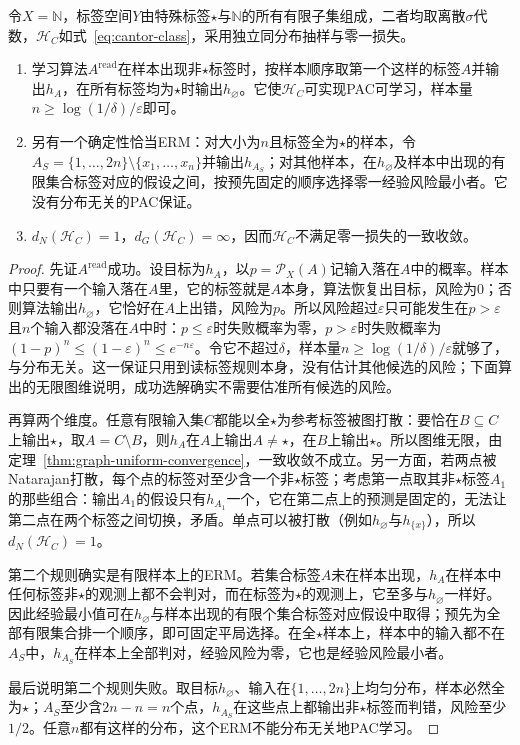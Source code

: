 \begin{theorem}[可学习性不推出一致收敛]
\label{thm:multiclass-erm-separation}
令$X=\mathbb N$，标签空间$Y$由特殊标签$\star$与$\mathbb N$的所有有限子集组成，二者均取离散$\sigma$代数，$\mathcal H_C$如式~\eqref{eq:cantor-class}，采用独立同分布抽样与零一损失。
\begin{enumerate}
 \item 学习算法$A^{\mathrm{read}}$在样本出现非$\star$标签时，按样本顺序取第一个这样的标签$A$并输出$h_A$，在所有标签均为$\star$时输出$h_{\varnothing}$。它使$\mathcal H_C$可实现PAC可学习，样本量$n\geq\log(1/\delta)/\varepsilon$即可。
 \item 另有一个确定性恰当ERM：对大小为$n$且标签全为$\star$的样本，令$A_S=\{1,\ldots,2n\}\setminus\{x_1,\ldots,x_n\}$并输出$h_{A_S}$；对其他样本，在$h_{\varnothing}$及样本中出现的有限集合标签对应的假设之间，按预先固定的顺序选择零一经验风险最小者。它没有分布无关的PAC保证。
 \item $d_N(\mathcal H_C)=1$，$d_G(\mathcal H_C)=\infty$，因而$\mathcal H_C$不满足零一损失的一致收敛。
\end{enumerate}
\end{theorem}

\begin{proof}
先证$A^{\mathrm{read}}$成功。设目标为$h_A$，以$p=\mathcal P_X(A)$记输入落在$A$中的概率。样本中只要有一个输入落在$A$里，它的标签就是$A$本身，算法恢复出目标，风险为0；否则算法输出$h_{\varnothing}$，它恰好在$A$上出错，风险为$p$。所以风险超过$\varepsilon$只可能发生在$p>\varepsilon$且$n$个输入都没落在$A$中时：$p\leq\varepsilon$时失败概率为零，$p>\varepsilon$时失败概率为$(1-p)^n\leq(1-\varepsilon)^n\leq e^{-n\varepsilon}$。令它不超过$\delta$，样本量$n\geq\log(1/\delta)/\varepsilon$就够了，与分布无关。这一保证只用到读标签规则本身，没有估计其他候选的风险；下面算出的无限图维说明，成功选解确实不需要估准所有候选的风险。

再算两个维度。任意有限输入集$C$都能以全$\star$为参考标签被图打散：要恰在$B\subseteq C$上输出$\star$，取$A=C\setminus B$，则$h_A$在$A$上输出$A\neq\star$，在$B$上输出$\star$。所以图维无限，由定理~\ref{thm:graph-uniform-convergence}，一致收敛不成立。另一方面，若两点被Natarajan打散，每个点的标签对至少含一个非$\star$标签；考虑第一点取其非$\star$标签$A_1$的那些组合：输出$A_1$的假设只有$h_{A_1}$一个，它在第二点上的预测是固定的，无法让第二点在两个标签之间切换，矛盾。单点可以被打散（例如$h_{\varnothing}$与$h_{\{x\}}$），所以$d_N(\mathcal H_C)=1$。

第二个规则确实是有限样本上的ERM。若集合标签$A$未在样本出现，$h_A$在样本中任何标签非$\star$的观测上都不会判对，而在标签为$\star$的观测上，它至多与$h_{\varnothing}$一样好。因此经验最小值可在$h_{\varnothing}$与样本出现的有限个集合标签对应假设中取得；预先为全部有限集合排一个顺序，即可固定平局选择。在全$\star$样本上，样本中的输入都不在$A_S$中，$h_{A_S}$在样本上全部判对，经验风险为零，它也是经验风险最小者。

最后说明第二个规则失败。取目标$h_{\varnothing}$、输入在$\{1,\ldots,2n\}$上均匀分布，样本必然全为$\star$；$A_S$至少含$2n-n=n$个点，$h_{A_S}$在这些点上都输出非$\star$标签而判错，风险至少$1/2$。任意$n$都有这样的分布，这个ERM不能分布无关地PAC学习。
\end{proof}

